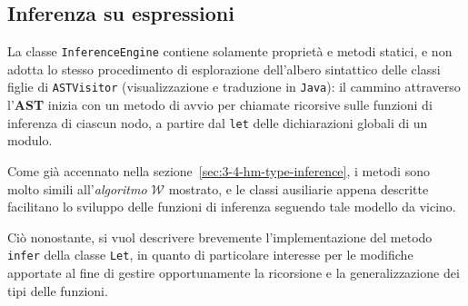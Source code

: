 \subsection{Inferenza su espressioni}
\label{sec:5-9-expression-inference}

La classe \texttt{InferenceEngine} contiene solamente proprietà e metodi statici, e non adotta lo stesso
procedimento di esplorazione dell'albero sintattico delle classi figlie di \texttt{ASTVisitor}
(visualizzazione e traduzione in \texttt{Java}): il cammino attraverso l'\textbf{AST} inizia con un metodo
di avvio per chiamate ricorsive sulle funzioni di inferenza di ciascun nodo,
a partire dal \texttt{let} delle dichiarazioni globali di un modulo.


Come già accennato nella sezione~\ref{sec:3-4-hm-type-inference}, i metodi sono molto simili all'\textit{algoritmo $\mathcal{W}$} mostrato,
e le classi ausiliarie appena descritte facilitano lo sviluppo delle funzioni di inferenza seguendo tale modello da vicino.

\noindent Ciò nonostante, si vuol descrivere brevemente l'implementazione del metodo \texttt{infer} della classe \texttt{Let},
in quanto di particolare interesse per le modifiche apportate al fine di gestire opportunamente
la ricorsione e la generalizzazione dei tipi delle funzioni.

